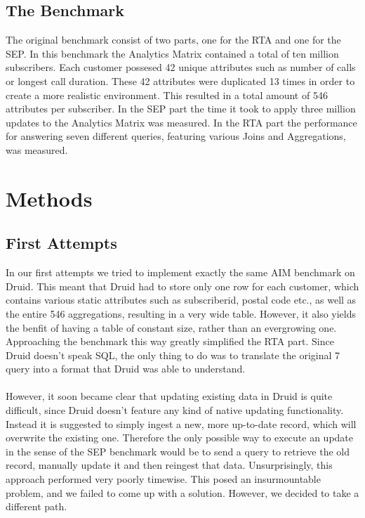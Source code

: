 \documentclass[11pt,singlecolumn]{scrartcl}
\begin{document}
\clearpage

\subsection{The Benchmark}
The original benchmark consist of two parts, one for the RTA and one for the SEP. In this benchmark the Analytics Matrix contained a total of ten million subscribers. Each customer possesed 42 unique attributes such as number of calls or longest call duration. These 42 attributes were duplicated 13 times in order to create a more realistic environment. This resulted in a total amount of 546 attributes per subscriber. In the SEP part the time it took to apply three million updates to the Analytics Matrix was measured. In the RTA part the performance for answering seven different queries, featuring various Joins and Aggregations, was measured. 
\clearpage

\section{Methods}

\subsection{First Attempts}
In our first attempts we tried to implement exactly the same AIM benchmark on Druid. This meant that Druid had to store only one row for each customer, which contains various static attributes such as subscriberid, postal code etc., as well as the entire 546 aggregations, resulting in a very wide table. However, it also yields the benfit of having a table of constant size, rather than an evergrowing one. Approaching the benchmark this way greatly simplified the RTA part. Since Druid doesn't speak SQL, the only thing to do was to translate the original 7 query into a format that Druid was able to understand.\\\\
However, it soon became clear that updating existing data in Druid is quite difficult, since Druid doesn't feature any kind of native updating functionality. Instead it is suggested to simply ingest a new, more up-to-date record, which will overwrite the existing one. Therefore the only possible way to execute an update in the sense of the SEP benchmark would be to send a query to retrieve the old record, manually update it and then reingest that data. Unsurprisingly, this approach performed very poorly timewise. This posed an insurmountable problem, and we failed to come up with a solution. However, we decided to take a different path.    
\end{document}
